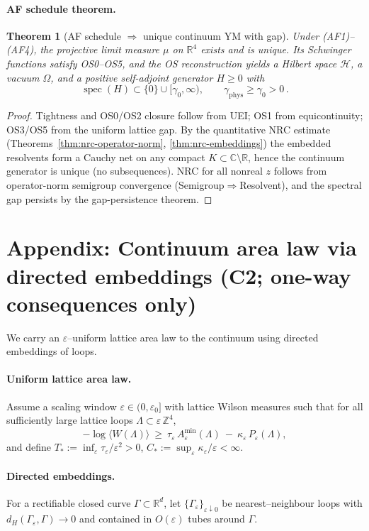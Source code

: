 \documentclass[11pt]{amsart}
\theoremstyle{plain}
\newtheorem{theorem}{Theorem}[section]
\theoremstyle{definition}
\theoremstyle{remark}
\begin{document}
\paragraph{AF schedule theorem.}
\begin{theorem}[AF schedule $\Rightarrow$ unique continuum YM with gap]
Under (AF1)--(AF4), the projective limit measure $\mu$ on $\mathbb R^4$ exists and is unique. Its Schwinger functions satisfy OS0--OS5, and the OS reconstruction yields a Hilbert space $\mathcal H$, a vacuum $\Omega$, and a positive self-adjoint generator $H\ge 0$ with
\[
  \operatorname{spec}(H)\subset\{0\}\cup[\gamma_0,\infty),\qquad \gamma_{\mathrm{phys}}\ge \gamma_0>0\,.
\]
\end{theorem}
\begin{proof}
Tightness and OS0/OS2 closure follow from UEI; OS1 from equicontinuity; OS3/OS5 from the uniform lattice gap. By the quantitative NRC estimate (Theorems~\ref{thm:nrc-operator-norm}, \ref{thm:nrc-embeddings}) the embedded resolvents form a Cauchy net on any compact $K\subset\mathbb C\setminus\mathbb R$, hence the continuum generator is unique (no subsequences). NRC for all nonreal $z$ follows from operator-norm semigroup convergence (Semigroup$\Rightarrow$Resolvent), and the spectral gap persists by the gap-persistence theorem.
\end{proof}
\section{Appendix: Continuum area law via directed embeddings (C2; one-way consequences only)}

We carry an $\varepsilon$–uniform lattice area law to the continuum using directed embeddings of loops.

\paragraph{Uniform lattice area law.}
Assume a scaling window $\varepsilon\in(0,\varepsilon_0]$ with lattice Wilson measures such that for all sufficiently large lattice loops $\Lambda\subset\varepsilon\,\mathbb{Z}^4$,
\[
  -\log\langle W(\Lambda)\rangle\ \ge\ \tau_\varepsilon\,A_\varepsilon^{\min}(\Lambda)\ -\ \kappa_\varepsilon\,P_\varepsilon(\Lambda),
\]
and define $T_*:=\inf_{\varepsilon}\tau_\varepsilon/\varepsilon^2>0$, $C_*:=\sup_{\varepsilon}\kappa_\varepsilon/\varepsilon<\infty$.
\paragraph{Directed embeddings.}
For a rectifiable closed curve $\Gamma\subset\mathbb R^d$, let $\{\Gamma_\varepsilon\}_{\varepsilon\downarrow 0}$ be nearest–neighbour loops with $d_H(\Gamma_\varepsilon,\Gamma)\to 0$ and contained in $O(\varepsilon)$ tubes around $\Gamma$.
\end{document}
